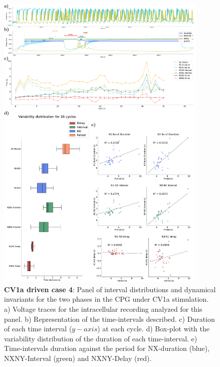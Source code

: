 \begin{figure}[htbp]
	\centering
	\includegraphics[width=0.9\textwidth]{./img/invariants/data/SUSSEX/CV1a_driven3/images/panel_with_intervals.pdf}
	\caption{\textbf{CV1a driven case 4}: Panel of interval distributions and dynamical invariants for the two phases in the CPG under CV1a stimulation. a) Voltage traces for the intracellular recording analyzed for this panel. b) Representation of the time-intervals described. c) Duration of each time interval ($y-axis$) at each cycle. d) Box-plot with the variability distribution of the duration of each time-interval. e) Time-intervals duration against the period for NX-duration (blue), NXNY-Interval (green) and NXNY-Delay (red).}
	\label{fig:cv1a 3 2phases}
\end{figure}




